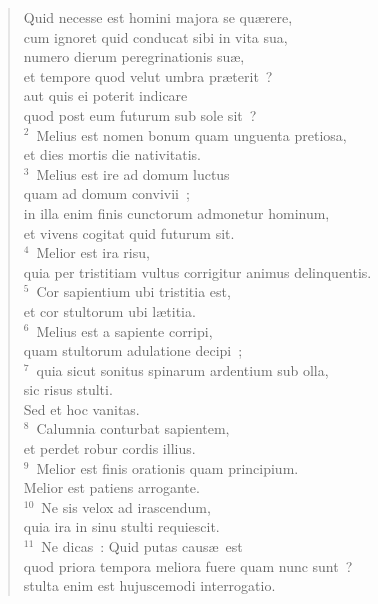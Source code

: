 \begin{flushleft}\begin{verse}\vspace{-19pt}Quid necesse est homini majora se qu\ae rere,\\ cum ignoret quid conducat sibi in vita sua,\\ numero dierum peregrinationis su\ae ,\\ et tempore quod velut umbra pr\ae terit~?\\ aut quis ei poterit indicare\\ quod post eum futurum sub sole sit~?\\
${}^{2}$~Melius est nomen bonum quam unguenta pretiosa,\\ et dies mortis die nativitatis.\\
${}^{3}$~Melius est ire ad domum luctus\\ quam ad domum convivii~;\\ in illa enim finis cunctorum admonetur hominum,\\ et vivens cogitat quid futurum sit.\\
${}^{4}$~Melior est ira risu,\\ quia per tristitiam vultus corrigitur animus delinquentis.\\
${}^{5}$~Cor sapientium ubi tristitia est,\\ et cor stultorum ubi l\ae titia.\\
${}^{6}$~Melius est a sapiente corripi,\\ quam stultorum adulatione decipi~;\\
${}^{7}$~quia sicut sonitus spinarum ardentium sub olla,\\ sic risus stulti.\\ Sed et hoc vanitas.\\
${}^{8}$~Calumnia conturbat sapientem,\\ et perdet robur cordis illius.\\
${}^{9}$~Melior est finis orationis quam principium.\\ Melior est patiens arrogante.\\
${}^{10}$~Ne sis velox ad irascendum,\\ quia ira in sinu stulti requiescit.\\
${}^{11}$~Ne dicas~: Quid putas caus\ae\ est\\ quod priora tempora meliora fuere quam nunc sunt~?\\ stulta enim est hujuscemodi interrogatio.\\

\end{verse}
\end{flushleft}
